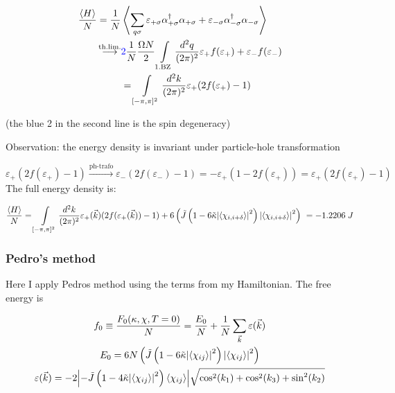 \documentclass[../../../main.tex]{subfiles}
\begin{document}
\begin{align}
	\frac{\langle H \rangle}{N} = \frac{1}{N}&\left\langle \sum_{q \sigma} \varepsilon_{+\sigma} \alpha_{+\sigma}^\dagger \alpha_{+\sigma} + \varepsilon_{-\sigma} \alpha_{-\sigma}^\dagger \alpha_{-\sigma}\right\rangle \notag \\
	\overset{\text{th.lim.}}{\longrightarrow} & \textcolor{blue}{2}\frac{1}{N}\frac{\Omega N}{2} \int\limits_{\text{1.BZ}} \frac{d^2q}{(2\pi)^2} \varepsilon_+ f(\varepsilon_+) + \varepsilon_- f(\varepsilon_-) \notag \\
	&= \int\limits_{[-\pi, \pi]^2} \frac{d^2k}{(2\pi)^2} \varepsilon_+ (2f(\varepsilon_+) -1 )
\end{align}

(the blue 2 in the second line is the spin degeneracy)

Observation: the energy density is invariant under particle-hole transformation

\begin{equation}
	\varepsilon_+(2f(\varepsilon_+) - 1) \overset{\text{ph-trafo}}{\longrightarrow} \varepsilon_-(2f(\varepsilon_-) - 1) = -\varepsilon_+(1-2f(\varepsilon_+)) = \varepsilon_+(2f(\varepsilon_+)-1)
\end{equation}
The full energy density is:

\begin{equation}
	\frac{\langle H \rangle}{N} = \int\limits_{[-\pi,\pi]^2}\frac{d^2k}{(2\pi)^2} \varepsilon_+(\vec{k}) (2f(\varepsilon_+(\vec{k}))-1) + 6\left( \tilde{J}\left(1-6\tilde{\kappa}\abs{\langle\chi_{i,i+\delta}\rangle}^2\right)\abs{\langle\chi_{i,i+\delta}\rangle}^2\right)
\ = -1.2206 \; J 
\end{equation}

\subsubsection{Pedro's method}

Here I apply Pedros method using the terms from my Hamiltonian. The free energy is 

\begin{gather}
	f_0 \equiv \frac{F_0(\kappa, \chi, T=0)}{N} = \frac{E_0}{N} + \frac{1}{N} \sum_{\vec{k}} \varepsilon(\vec{k}) \\
	E_0 = 6N\left( \tilde{J}\left(1-6\tilde{\kappa}\abs{\langle \chi_{ij} \rangle}^2\right) \abs{\langle \chi_{ij} \rangle}^2\right) \\
	\varepsilon(\vec{k}) = -2\abs{-\tilde{J}\left(1-4\tilde{\kappa}\abs{\langle \chi_{ij} \rangle}^2\right)\langle \chi_{ij}\rangle} \sqrt{\cos^2(k_1) + \cos^2(k_3) + \sin^2(k_2)} 
\end{gather}
\end{document}

